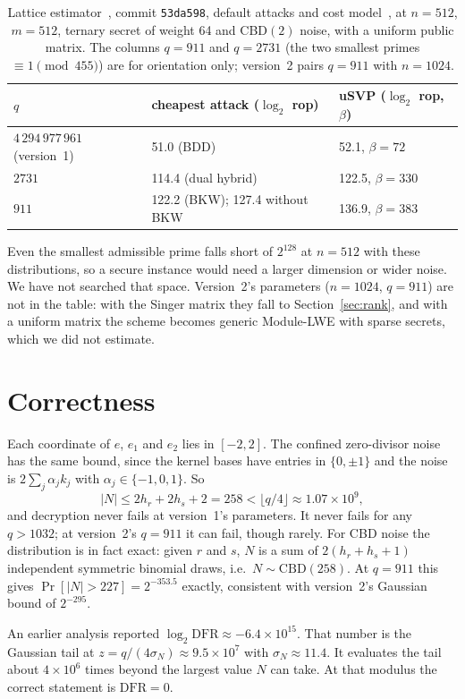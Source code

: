 \documentclass[11pt]{article}
\theoremstyle{remark}
\begin{document}
\begin{table}[h]\centering\small
\begin{tabular}{lll}\toprule
$q$ & cheapest attack ($\log_2$ rop) & uSVP ($\log_2$ rop, $\beta$)\\\midrule
$4\,294\,977\,961$ (version~1) & 51.0 (BDD) & 52.1, $\beta=72$\\
$2731$ & 114.4 (dual hybrid) & 122.5, $\beta=330$\\
$911$ & 122.2 (BKW); 127.4 without BKW & 136.9, $\beta=383$\\\bottomrule
\end{tabular}
\caption{Lattice estimator~\cite{estimator}, commit \texttt{53da598}, default attacks and cost model~\cite{MATZOV}, at $n=512$, $m=512$, ternary
secret of weight 64 and CBD$(2)$ noise, with a uniform public matrix. The columns $q=911$ and $q=2731$ (the two smallest
primes $\equiv1\pmod{455}$) are for orientation only; version~2 pairs $q=911$ with $n=1024$.}\label{tab:est}
\end{table}

Even the smallest admissible prime falls short of $2^{128}$ at $n=512$ with these distributions, so a secure instance
would need a larger dimension or wider noise. We have not searched that space. Version~2's parameters ($n=1024$,
$q=911$) are not in the table: with the Singer matrix they fall to Section~\ref{sec:rank}, and with a uniform matrix the
scheme becomes generic Module-LWE with sparse secrets, which we did not estimate.

\section{Correctness}

Each coordinate of $e$, $e_1$ and $e_2$ lies in $[-2,2]$. The confined zero-divisor noise has the same bound, since the
kernel bases have entries in $\{0,\pm1\}$ and the noise is $2\sum_j\alpha_jk_j$ with $\alpha_j\in\{-1,0,1\}$. So
\[
|N|\le 2h_r+2h_s+2=258<\lfloor q/4\rfloor\approx1.07\times10^{9},
\]
and decryption never fails at version~1's parameters. It never fails for any $q>1032$; at version~2's $q=911$ it can
fail, though rarely. For CBD noise the distribution
is in fact exact: given $r$ and $s$, $N$ is a sum of $2(h_r+h_s+1)$ independent symmetric binomial draws, i.e.\
$N\sim\mathrm{CBD}(258)$. At $q=911$ this gives $\Pr[|N|>227]=2^{-353.5}$ exactly, consistent with version~2's
Gaussian bound of $2^{-295}$.

An earlier analysis reported $\log_2\mathrm{DFR}\approx-6.4\times10^{15}$. That number is the Gaussian tail at
$z=q/(4\sigma_N)\approx9.5\times10^{7}$ with $\sigma_N\approx11.4$. It evaluates the tail about $4\times10^{6}$ times
beyond the largest value $N$ can take. At that modulus the correct statement is $\mathrm{DFR}=0$.
\end{document}
